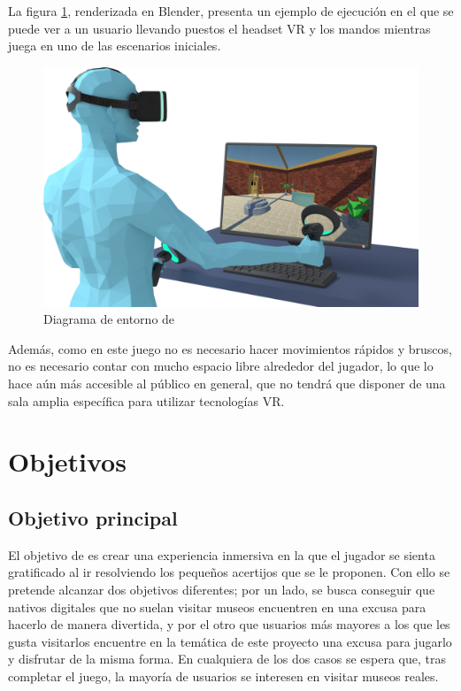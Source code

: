 La figura \ref{fig:entorno}, renderizada en Blender, presenta un ejemplo de ejecución en el que se puede ver a un usuario llevando puestos el headset \acs{VR} y los mandos mientras juega en uno de las escenarios iniciales. 

\begin{figure}[!h]
\vspace{0.4cm}
\begin{center}
\includegraphics[width=1\textwidth]{imagenes/1/entorno-diffuse-2.png}
\caption{Diagrama de entorno de \MineRVa}
\label{fig:entorno}
\end{center}
\end{figure}

Además, como en este juego no es necesario hacer movimientos rápidos y bruscos, no es necesario contar con mucho espacio libre alrededor del jugador, lo que lo hace aún más accesible al público en general, que no tendrá que disponer de una sala amplia específica para utilizar tecnologías \acs{VR}.


\section{Objetivos}

\subsection{Objetivo principal}

El objetivo de \MineRVa es crear una experiencia inmersiva en la que el jugador se sienta gratificado al ir resolviendo los pequeños acertijos que se le proponen. Con ello se pretende alcanzar dos objetivos diferentes; por un lado, se busca conseguir que nativos digitales que no suelan visitar museos encuentren en \MineRVa una excusa para hacerlo de manera divertida, y por el otro que usuarios más mayores a los que les gusta visitarlos encuentre en la temática de este proyecto una excusa para jugarlo y disfrutar de la misma forma. En cualquiera de los dos casos se espera que, tras completar el juego, la mayoría de usuarios se interesen en visitar museos reales.

